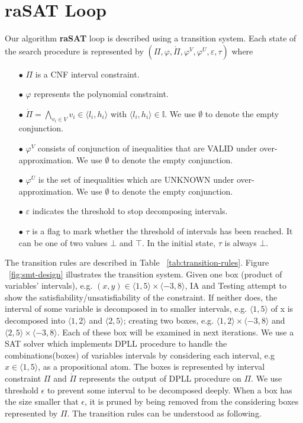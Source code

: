 \section{raSAT Loop} 
Our algorithm \textbf{raSAT} loop is described using a transition system. Each state of the search procedure is represented by $(\Pi, \varphi, \mathring{\Pi}, \varphi^V, \varphi^U, \varepsilon, \tau)$ where 
\begin{itemize}
\item[$\bullet$] $\Pi$ is a CNF interval constraint.
\item[$\bullet$] $\varphi$ represents the polynomial constraint.
\item[$\bullet$] $\mathring{\Pi} = \bigwedge\limits_{v_i \in V} v_i \in \langle l_i, h_i \rangle$ with $\langle l_i, h_i \rangle \in \mathbb{I}$. We use $\emptyset$ to denote the empty conjunction.
\item[$\bullet$] $\varphi^V$ consists of conjunction of inequalities that are VALID under over-approximation. We use $\emptyset$ to denote the empty conjunction.
\item[$\bullet$] $\varphi^U$ is the set of inequalities which are UNKNOWN under over-approximation. We use $\emptyset$ to denote the empty conjunction.
\item[$\bullet$] $\varepsilon$ indicates the threshold to stop decomposing intervals.
\item[$\bullet$] $\tau$ is a flag to mark whether the threshold of intervals has been reached. It can be one of two values $\bot$ and $\top$. In the initial state, $\tau$ is always $\bot$.
\end{itemize}
The transition rules are described in Table ~\ref{tab:transition-rules}. Figure ~\ref{fig:smt-design} illustrates the transition system. Given one box (product of variables' intervals), e.g. $(x, y) \in \langle 1, 5 \rangle \times \langle -3, 8 \rangle$, IA and Testing attempt to show the satisfiability/unsatisfiability of the constraint. If neither does, the interval of some variable is decomposed in to smaller intervals, e.g. $\langle 1, 5 \rangle$ of x is decomposed into $\langle 1, 2 \rangle$ and $\langle 2, 5 \rangle$; creating two boxes, e.g. $\langle 1, 2 \rangle \times \langle -3, 8 \rangle$ and $\langle 2, 5 \rangle \times \langle -3, 8 \rangle$. Each of these box will be examined in next iterations. We use a SAT solver which implements DPLL procedure to 
handle the combinations(boxes) of variables intervals by considering each interval, e.g $x \in \langle 1, 5 \rangle$, as a propositional atom. The boxes is represented by interval constraint $\Pi$ and $\mathring{\Pi}$ represents the output of DPLL procedure on $\Pi$. We use threshold $\epsilon$ to prevent some interval to be decomposed deeply. When a box has the size smaller that $\epsilon$, it is pruned by being removed from the considering boxes represented by $\Pi$. The transition rules can be understood as following.
